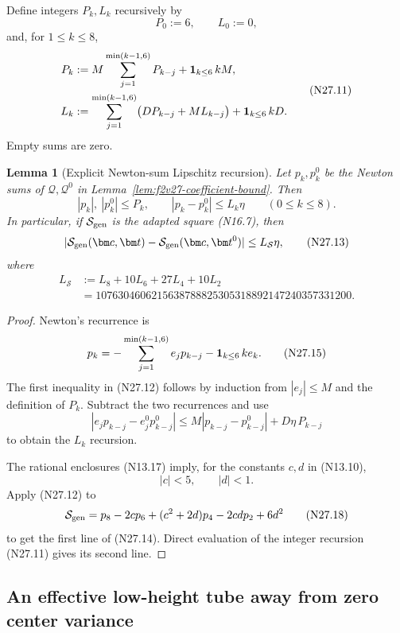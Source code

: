\documentclass[11pt]{article}
\newtheorem{lemma}[theorem]{Lemma}
\theoremstyle{definition}
\theoremstyle{remark}
\begin{document}
Define integers \(P_k,L_k\) recursively by
\[
 P_0:=6,\qquad L_0:=0,
 \tag{N27.10}
\]
and, for \(1\leq k\leq8\),
\[
\begin{aligned}
 P_k&:=M\sum_{j=1}^{\min(k-1,6)}P_{k-j}
      +{\bf1}_{k\leq6}\,kM,\\
 L_k&:=\sum_{j=1}^{\min(k-1,6)}
      \bigl(DP_{k-j}+ML_{k-j}\bigr)
      +{\bf1}_{k\leq6}\,kD.
\end{aligned}
\tag{N27.11}
\]
Empty sums are zero.

\begin{lemma}[Explicit Newton-sum Lipschitz recursion]
\label{lem:f2v27-newton-bound}
Let \(p_k,p_k^0\) be the Newton sums of
\(\mathcal Q,\mathcal Q^0\) in
Lemma~\ref{lem:f2v27-coefficient-bound}.  Then
\[
 |p_k|,\ |p_k^0|\leq P_k,\qquad
 |p_k-p_k^0|\leq L_k\eta
 \qquad(0\leq k\leq8).
 \tag{N27.12}
\]
In particular, if \(\mathcal S_{\rm gen}\) is the adapted square
\textup{(N16.7)}, then
\[
 |\mathcal S_{\rm gen}(\bm c,\bm t)
  -\mathcal S_{\rm gen}(\bm c,\bm t^0)|
 \leq L_{\mathcal S}\eta,
 \tag{N27.13}
\]
where
\[
\begin{aligned}
 L_{\mathcal S}
 &:=L_8+10L_6+27L_4+10L_2\\
 &=1076304606215638788825305318892147240357331200.
\end{aligned}
\tag{N27.14}
\]
\end{lemma}

\begin{proof}
Newton's recurrence is
\[
 p_k=-\sum_{j=1}^{\min(k-1,6)}e_jp_{k-j}
      -{\bf1}_{k\leq6}\,ke_k.
 \tag{N27.15}
\]
The first inequality in \textup{(N27.12)} follows by induction from
\(|e_j|\leq M\) and the definition of \(P_k\).  Subtract the two
recurrences and use
\[
 |e_jp_{k-j}-e_j^0p_{k-j}^0|
 \leq M|p_{k-j}-p_{k-j}^0|
      +D\eta\,P_{k-j}
 \tag{N27.16}
\]
to obtain the \(L_k\) recursion.

The rational enclosures \textup{(N13.17)} imply, for the constants
\(c,d\) in \textup{(N13.10)},
\[
 |c|<5,\qquad |d|<1.
 \tag{N27.17}
\]
Apply \textup{(N27.12)} to
\[
 \mathcal S_{\rm gen}
 =p_8-2cp_6+(c^2+2d)p_4-2cdp_2+6d^2
 \tag{N27.18}
\]
to get the first line of \textup{(N27.14)}.  Direct evaluation of the
integer recursion \textup{(N27.11)} gives its second line.
\end{proof}

\subsection{An effective low-height tube away from zero center variance}
\label{subsec:f2v27-low}
\end{document}
